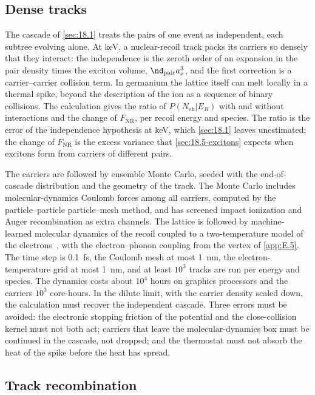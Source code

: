 \subsection{Dense tracks}

The cascade of \cref{sec:18.1} treats the pairs of one event as independent, each subtree evolving alone. At keV, a nuclear-recoil track packs its carriers so densely that they interact: the independence is the zeroth order of an expansion in the pair density times the exciton volume, $\nd_{\mathrm{pair}}a_x^3$, and the first correction is a carrier--carrier collision term. In germanium the lattice itself can melt locally in a thermal spike, beyond the description of the ion as a sequence of binary collisions. The calculation gives the ratio of $P(N_{\mathrm{eh}}|E_R)$ with and without interactions and the change of $F_{\mathrm{NR}}$, per recoil energy and species. The ratio is the error of the independence hypothesis at keV, which \cref{sec:18.1} leaves unestimated; the change of $F_{\mathrm{NR}}$ is the excess variance that \cref{sec:18.5-excitons} expects when excitons form from carriers of different pairs.

The carriers are followed by ensemble Monte Carlo, seeded with the end-of-cascade distribution and the geometry of the track. The Monte Carlo includes molecular-dynamics Coulomb forces among all carriers, computed by the particle--particle particle--mesh method, and has screened impact ionization and Auger recombination as extra channels. The lattice is followed by machine-learned molecular dynamics of the recoil coupled to a two-temperature model of the electrons~\cite{duffy2007including}, with the electron--phonon coupling from the vertex of \cref{app:E.5}. The time step is \SI{0.1}{fs}, the Coulomb mesh at most \SI{1}{nm}, the electron-temperature grid at most \SI{1}{nm}, and at least $10^3$ tracks are run per energy and species. The dynamics costs about $10^4$ hours on graphics processors and the carriers $10^3$ core-hours. In the dilute limit, with the carrier density scaled down, the calculation must recover the independent cascade. Three errors must be avoided: the electronic stopping friction of the potential and the close-collision kernel must not both act; carriers that leave the molecular-dynamics box must be continued in the cascade, not dropped; and the thermostat must not absorb the heat of the spike before the heat has spread.

\subsection{Track recombination}

